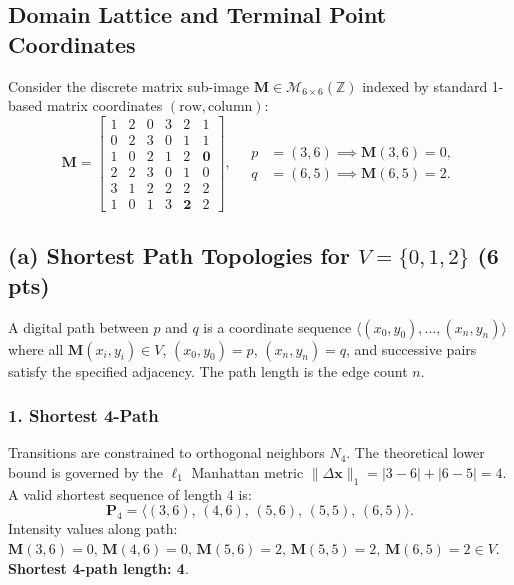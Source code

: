 \documentclass[11pt,a4paper]{article}
\begin{document}
\subsection{Domain Lattice and Terminal Point Coordinates}
Consider the discrete matrix sub-image $\mathbf{M} \in \mathcal{M}_{6 \times 6}(\mathbb{Z})$ indexed by standard 1-based matrix coordinates $(\text{row}, \text{column})$:
\begin{equation}
\mathbf{M} = \begin{bmatrix}
1 & 2 & 0 & 3 & 2 & 1 \\
0 & 2 & 3 & 0 & 1 & 1 \\
1 & 0 & 2 & 1 & 2 & \mathbf{0} \\
2 & 2 & 3 & 0 & 1 & 0 \\
3 & 1 & 2 & 2 & 2 & 2 \\
1 & 0 & 1 & 3 & \mathbf{2} & 2
\end{bmatrix}, \quad
\begin{aligned}
p &= (3, 6) \implies \mathbf{M}(3, 6) = 0, \\
q &= (6, 5) \implies \mathbf{M}(6, 5) = 2.
\end{aligned}
\end{equation}

\subsection{(a) Shortest Path Topologies for \texorpdfstring{$V = \{0, 1, 2\}$}{V = {0, 1, 2}} (6 pts)}
A digital path between $p$ and $q$ is a coordinate sequence $\langle (x_0, y_0), \dots, (x_n, y_n) \rangle$ where all $\mathbf{M}(x_i, y_i) \in V$, $(x_0, y_0) = p$, $(x_n, y_n) = q$, and successive pairs satisfy the specified adjacency. The path length is the edge count $n$.

\subsubsection{1. Shortest 4-Path}
Transitions are constrained to orthogonal neighbors $N_4$. The theoretical lower bound is governed by the $\ell_1$ Manhattan metric $\|\Delta \mathbf{x}\|_1 = |3 - 6| + |6 - 5| = 4$. A valid shortest sequence of length 4 is:
\begin{equation}
\mathbf{P}_4 = \langle (3, 6), \, (4, 6), \, (5, 6), \, (5, 5), \, (6, 5) \rangle.
\end{equation}
\noindent Intensity values along path: $\mathbf{M}(3, 6)=0, \, \mathbf{M}(4, 6)=0, \, \mathbf{M}(5, 6)=2, \, \mathbf{M}(5, 5)=2, \, \mathbf{M}(6, 5)=2 \in V$. \\
\textbf{Shortest 4-path length: 4}.
\end{document}
